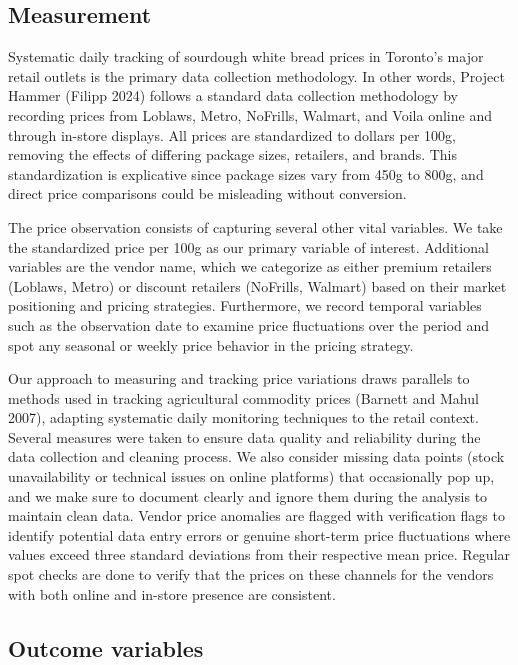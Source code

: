 \documentclass[
  letterpaper,
  DIV=11,
  numbers=noendperiod]{scrartcl}
\begin{document}
\subsection{Measurement}\label{measurement}

Systematic daily tracking of sourdough white bread prices in Toronto's
major retail outlets is the primary data collection methodology. In
other words, Project Hammer (Filipp 2024) follows a standard data
collection methodology by recording prices from Loblaws, Metro,
NoFrills, Walmart, and Voila online and through in-store displays. All
prices are standardized to dollars per 100g, removing the effects of
differing package sizes, retailers, and brands. This standardization is
explicative since package sizes vary from 450g to 800g, and direct price
comparisons could be misleading without conversion.

The price observation consists of capturing several other vital
variables. We take the standardized price per 100g as our primary
variable of interest. Additional variables are the vendor name, which we
categorize as either premium retailers (Loblaws, Metro) or discount
retailers (NoFrills, Walmart) based on their market positioning and
pricing strategies. Furthermore, we record temporal variables such as
the observation date to examine price fluctuations over the period and
spot any seasonal or weekly price behavior in the pricing strategy.

Our approach to measuring and tracking price variations draws parallels
to methods used in tracking agricultural commodity prices (Barnett and
Mahul 2007), adapting systematic daily monitoring techniques to the
retail context. Several measures were taken to ensure data quality and
reliability during the data collection and cleaning process. We also
consider missing data points (stock unavailability or technical issues
on online platforms) that occasionally pop up, and we make sure to
document clearly and ignore them during the analysis to maintain clean
data. Vendor price anomalies are flagged with verification flags to
identify potential data entry errors or genuine short-term price
fluctuations where values exceed three standard deviations from their
respective mean price. Regular spot checks are done to verify that the
prices on these channels for the vendors with both online and in-store
presence are consistent.

\subsection{Outcome variables}\label{outcome-variables}
\end{document}
